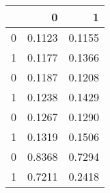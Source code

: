 \begin{tabular}{lrr}
\toprule
{} &       0 &       1 \\
\midrule
0 &  0.1123 &  0.1155 \\
1 &  0.1177 &  0.1366 \\
0 &  0.1187 &  0.1208 \\
1 &  0.1238 &  0.1429 \\
0 &  0.1267 &  0.1290 \\
1 &  0.1319 &  0.1506 \\
0 &  0.8368 &  0.7294 \\
1 &  0.7211 &  0.2418 \\
\bottomrule
\end{tabular}
